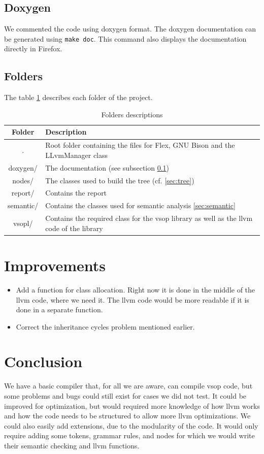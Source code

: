 \documentclass[a4paper,11pt]{article}
\begin{document}
\subsection{Doxygen}
  \label{Doxygen}
  We commented the code using doxygen format. The doxygen documentation can be generated using \texttt{make doc}. This command also displays the documentation directly in Firefox.
  \subsection{Folders}
    The table \ref{fig:folders} describes each folder of the project.
    \begin{table}[H]
      \begin{tabular}{|c|p{10cm}|}
      \hline
      Folder & Description\\
      \hline\hline
      . &  Root folder containing the files for Flex, GNU Bison and the LLvmManager class  \\\hline
      doxygen/ & The documentation (see subsection \ref{Doxygen}) \\\hline
      nodes/ & The classes used to build the tree (cf. \ref{sec:tree})\\\hline
      report/ & Contains the report\\\hline
      semantic/ & Contains the classes used for semantic analysis \ref{sec:semantic}\\\hline
      vsopl/ & Contains the required class for the vsop library as well as the llvm code of the library\\\hline
      \end{tabular}
      \caption{\label{fig:folders}Folders descriptions}
    \end{table}
    
\section{Improvements}
  \label{sec:improvements}
  \begin{itemize}
  \item Add a function for class allocation. Right now it is done in the middle of the llvm code, where we need it. The llvm code would be more readable if it is done in a separate function.
  \item Correct the inheritance cycles problem mentioned earlier.
  \end{itemize}


\section{Conclusion}
We have a basic compiler that, for all we are aware, can compile vsop code, but some problems and bugs could still exist for cases we did not test. It could be improved for optimization, but would required more knowledge of how llvm works and how the code needs to be structured to allow more llvm optimizations. We could also easily add extensions, due to the modularity of the code. It would only require adding some tokens, grammar rules, and nodes for which we would write their semantic checking and llvm functions.
\end{document}
